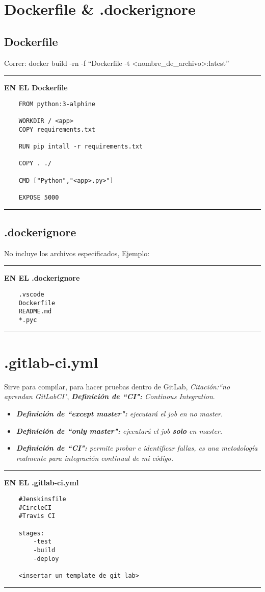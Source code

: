 \section{Dockerfile \& .dockerignore}
\subsection{Dockerfile}
Correr: docker build -rn -f ``Dockerfile -t <nombre\_de\_archivo>:latest''\newline 
\rule{16cm}{1pt}
\textbf{EN EL Dockerfile}\newline 
\begin{verbatim}
    FROM python:3-alphine 

    WORKDIR / <app>
    COPY requirements.txt
    
    RUN pip intall -r requirements.txt 

    COPY . ./
    
    CMD ["Python","<app>.py>"]

    EXPOSE 5000 
\end{verbatim}
\rule{16cm}{1pt}\newline 


\subsection{.dockerignore}
No incluye los archivos especificados, \newline 
Ejemplo:\newline 
\rule{16cm}{1pt}\newline 
\textbf{EN EL .dockerignore}
\begin{verbatim}
    .vscode
    Dockerfile 
    README.md 
    *.pyc
\end{verbatim}
\rule{16cm}{1pt}\newline 


\section{.gitlab-ci.yml}
Sirve para compilar, para hacer pruebas dentro de GitLab, \emph{Citación:``no aprendan GitLabCI"}, \emph{\textbf{Definición de ``CI":} Continous Integration}.
\begin{itemize}
    \item \emph{\textbf{Definición de ``except master":} ejecutará el job en no master.}
    \item \emph{\textbf{Definición de ``only master":} ejecutará el job \textbf{solo} en master.}
    \item \emph{\textbf{Definición de ``CI":} permite probar e identificar fallas, es una metodología realmente para integración continual de mi código.}
\end{itemize}
\rule{16cm}{1pt}\newline 
\textbf{EN EL .gitlab-ci.yml}
\begin{verbatim}
    #Jenskinsfile
    #CircleCI
    #Travis CI 

    stages:
        -test 
        -build 
        -deploy
    
    <insertar un template de git lab>
\end{verbatim}
\rule{16cm}{1pt}\newline 

